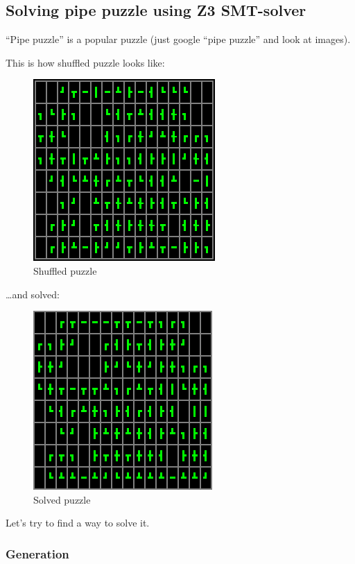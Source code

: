 \subsection{Solving pipe puzzle using Z3 SMT-solver}

``Pipe puzzle'' is a popular puzzle (just google ``pipe puzzle'' and look at images).

This is how shuffled puzzle looks like:

\begin{figure}[H]
\label{fig:pipe_shuffled}
\centering
\includegraphics[scale=0.75]{SMT/pipe/shuffled.png}
\caption{Shuffled puzzle}
\end{figure}

\dots and solved:

\begin{figure}[H]
\label{fig:pipe_solved}
\centering
\includegraphics[scale=0.75]{SMT/pipe/solved.png}
\caption{Solved puzzle}
\end{figure}

Let's try to find a way to solve it.

\subsubsection{Generation}

